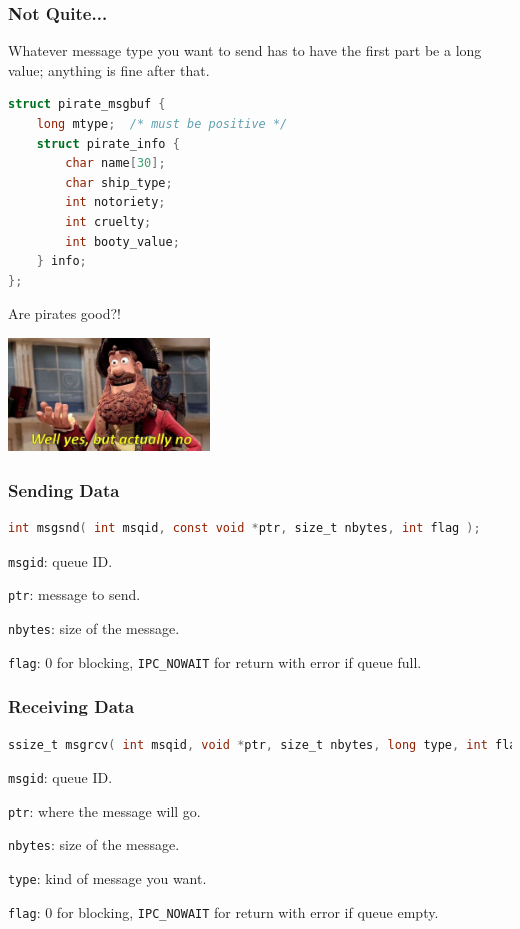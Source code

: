 \begin{frame}[fragile]
\frametitle{Not Quite...}

Whatever message type you want to send has to have the first part be a long value; anything is fine after that.

\begin{lstlisting}[language=C]
struct pirate_msgbuf {
    long mtype;  /* must be positive */
    struct pirate_info {
        char name[30];
        char ship_type;
        int notoriety;
        int cruelty;
        int booty_value;
    } info;
};
\end{lstlisting}

Are pirates good?!
\begin{center}
	\includegraphics[width=0.4\textwidth]{images/yesbutno.jpg}
\end{center}

\end{frame}

\begin{frame}[fragile]
\frametitle{Sending Data}
\begin{lstlisting}[language=C]
int msgsnd( int msqid, const void *ptr, size_t nbytes, int flag );
\end{lstlisting}

\texttt{msgid}: queue ID.

\texttt{ptr}: message to send.

\texttt{nbytes}: size of the message.

\texttt{flag}: 0 for blocking, \texttt{IPC\_NOWAIT} for return with error if queue full.

\end{frame}


\begin{frame}[fragile]
\frametitle{Receiving Data}
\begin{lstlisting}[language=C]
ssize_t msgrcv( int msqid, void *ptr, size_t nbytes, long type, int flag );
\end{lstlisting}

\texttt{msgid}: queue ID.

\texttt{ptr}: where the message will go.

\texttt{nbytes}: size of the message.

\texttt{type}: kind of message you want.

\texttt{flag}: 0 for blocking, \texttt{IPC\_NOWAIT} for return with error if queue empty.

\end{frame}

